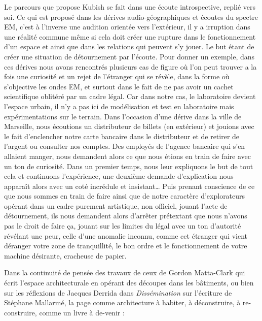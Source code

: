 {Le parcours que propose Kubish se fait dans une \'ecoute introspective,
repli\'e vers soi. Ce qui est propos\'e dans les d\'erives
audio{}-g\'eographiques et \'ecoutes du spectre EM,
c'est \`a l'inverse une audition
orient\'ee vers l'ext\'erieur, il y a irruption dans
une r\'ealit\'e commune m\^eme si cela doit cr\'eer une rupture dans le
fonctionnement d'un espace et ainsi que dans les
relations qui peuvent s'y jouer. Le but \'etant de
cr\'eer une situation de d\'etournement par
l'\'ecoute. Pour donner un exemple, dans ces d\'erives
nous avons rencontr\'es plusieurs cas de figure o\`u
l'on peut trouver a la fois une curiosit\'e et un
rejet de l'\'etranger qui se r\'ev\`ele, dans la forme
o\`u s'objective les ondes EM, et surtout dans le fait
de ne pas avoir un cachet scientifique oblit\'er\'e par un cadre
l\'egal. Car dans notre cas, le laboratoire devient
l'espace urbain, il n'y a pas ici de
mod\'elisation et test en laboratoire mais exp\'erimentations sur le
terrain. Dans l'occasion d'une
d\'erive dans la ville de Marseille, nous \'ecoutions un distributeur
de billets (en ext\'erieur) et jouions avec le fait
d'enclencher notre carte bancaire dans le distributeur
et de retirer de l'argent ou consulter nos comptes.
Des employ\'es de l'agence bancaire qui
s'en allaient manger, nous demandent alors ce que nous
\'etions en train de faire avec un ton de curiosit\'e. Dans un premier
temps, nous leur expliquons le but de tout cela et continuons
l'exp\'erience, une deuxi\`eme demande
d'explication nous appara\^it alors avec un cot\'e
incr\'edule et insistant{\dots} Puis prenant conscience de ce que nous
sommes en train de faire ainsi que de notre caract\`ere
d'explorateurs op\'erant dans un cadre purement
artistique, non officiel, jouant l'acte de
d\'etournement, ils nous demandent alors d'arr\^eter
pr\'etextant que nous n'avons pas le droit de faire
\c{c}a, jouant sur les limites du l\'egal avec un ton
d'autorit\'e r\'ev\'elant une peur, celle
d'une anomalie inconnu, comme cet \'etranger qui vient
d\'eranger votre zone de tranquillit\'e, le bon ordre et le
fonctionnement de votre machine d\'esirante, cracheuse de papier.


Dans la continuit\'e de pens\'ee des travaux de ceux de Gordon
Matta{}-Clark qui \'ecrit l'espace architecturale en
op\'erant des d\'ecoupes dans les b\^atiments, ou bien sur les
r\'eflexions de Jacques Derrida dans {\em Diss\'emination} sur
l'\'ecriture de St\'ephane Mallarm\'e, la page comme
architecture \`a habiter, \`a d\'econstruire, \`a re{}-construire,
comme un livre \`a de{}-venir :

}
